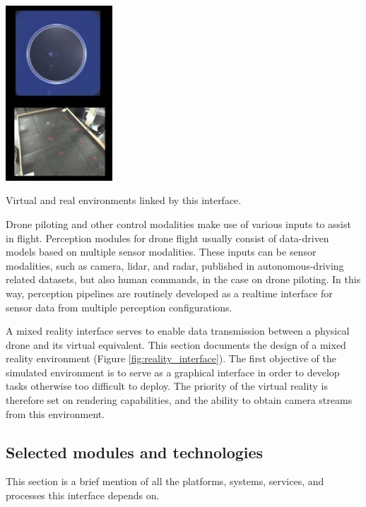 \begin{marginfigure}%
    \raggedright
    \hspace{0.3cm}\includegraphics[width=4cm]{images/xr_system/xr_topview_margin.jpg}
    \caption{Virtual and real environments linked by this interface.}
    \label{fig:reality_interface}
\end{marginfigure}

Drone piloting and other control modalities \cite{tezza_andujar_2019} make use of various inputs to assist in flight. Perception modules for drone flight usually consist of data-driven models based on multiple sensor modalities. These inputs can be sensor modalities, such as camera, lidar, and radar, published in autonomous-driving related datasets, but also human commands, in the case on drone piloting. In this way, perception pipelines are routinely developed as a realtime interface for sensor data from multiple perception configurations. 

A mixed reality interface serves to enable data transmission between a physical drone and its virtual equivalent. This section documents the design of a mixed reality environment (Figure \ref{fig:reality_interface}). The first objective of the simulated environment is to serve as a graphical interface in order to develop tasks otherwise too difficult to deploy. The priority of the virtual reality is therefore set on rendering capabilities, and the ability to obtain camera streams from this environment.%

\subsection{Selected modules and technologies}

This section is a brief mention of all the platforms, systems, services, and processes this interface depends on.

